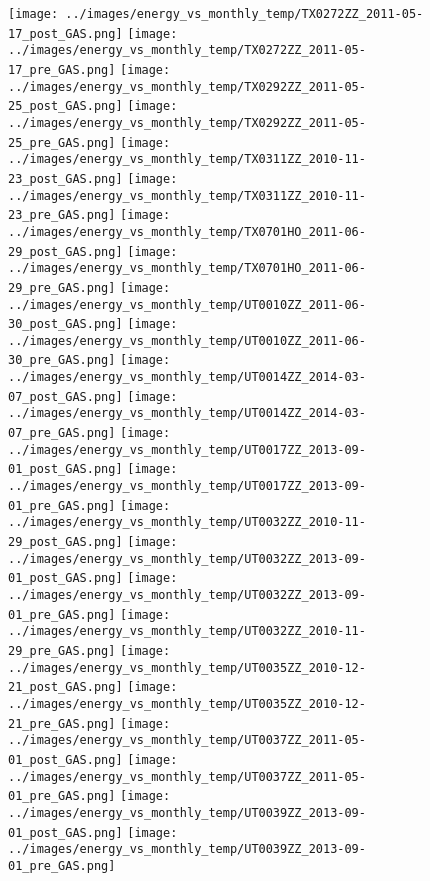 \clearpage
\begin{figure}
\centering
\texttt{[image: ../images/energy\_vs\_monthly\_temp/TX0272ZZ\_2011-05-17\_post\_GAS.png]}
\texttt{[image: ../images/energy\_vs\_monthly\_temp/TX0272ZZ\_2011-05-17\_pre\_GAS.png]}
\texttt{[image: ../images/energy\_vs\_monthly\_temp/TX0292ZZ\_2011-05-25\_post\_GAS.png]}
\texttt{[image: ../images/energy\_vs\_monthly\_temp/TX0292ZZ\_2011-05-25\_pre\_GAS.png]}
\texttt{[image: ../images/energy\_vs\_monthly\_temp/TX0311ZZ\_2010-11-23\_post\_GAS.png]}
\texttt{[image: ../images/energy\_vs\_monthly\_temp/TX0311ZZ\_2010-11-23\_pre\_GAS.png]}
\texttt{[image: ../images/energy\_vs\_monthly\_temp/TX0701HO\_2011-06-29\_post\_GAS.png]}
\texttt{[image: ../images/energy\_vs\_monthly\_temp/TX0701HO\_2011-06-29\_pre\_GAS.png]}
\texttt{[image: ../images/energy\_vs\_monthly\_temp/UT0010ZZ\_2011-06-30\_post\_GAS.png]}
\texttt{[image: ../images/energy\_vs\_monthly\_temp/UT0010ZZ\_2011-06-30\_pre\_GAS.png]}
\texttt{[image: ../images/energy\_vs\_monthly\_temp/UT0014ZZ\_2014-03-07\_post\_GAS.png]}
\texttt{[image: ../images/energy\_vs\_monthly\_temp/UT0014ZZ\_2014-03-07\_pre\_GAS.png]}
\texttt{[image: ../images/energy\_vs\_monthly\_temp/UT0017ZZ\_2013-09-01\_post\_GAS.png]}
\texttt{[image: ../images/energy\_vs\_monthly\_temp/UT0017ZZ\_2013-09-01\_pre\_GAS.png]}
\texttt{[image: ../images/energy\_vs\_monthly\_temp/UT0032ZZ\_2010-11-29\_post\_GAS.png]}
\texttt{[image: ../images/energy\_vs\_monthly\_temp/UT0032ZZ\_2013-09-01\_post\_GAS.png]}
\texttt{[image: ../images/energy\_vs\_monthly\_temp/UT0032ZZ\_2013-09-01\_pre\_GAS.png]}
\texttt{[image: ../images/energy\_vs\_monthly\_temp/UT0032ZZ\_2010-11-29\_pre\_GAS.png]}
\texttt{[image: ../images/energy\_vs\_monthly\_temp/UT0035ZZ\_2010-12-21\_post\_GAS.png]}
\texttt{[image: ../images/energy\_vs\_monthly\_temp/UT0035ZZ\_2010-12-21\_pre\_GAS.png]}
\texttt{[image: ../images/energy\_vs\_monthly\_temp/UT0037ZZ\_2011-05-01\_post\_GAS.png]}
\texttt{[image: ../images/energy\_vs\_monthly\_temp/UT0037ZZ\_2011-05-01\_pre\_GAS.png]}
\texttt{[image: ../images/energy\_vs\_monthly\_temp/UT0039ZZ\_2013-09-01\_post\_GAS.png]}
\texttt{[image: ../images/energy\_vs\_monthly\_temp/UT0039ZZ\_2013-09-01\_pre\_GAS.png]}
\end{figure}
